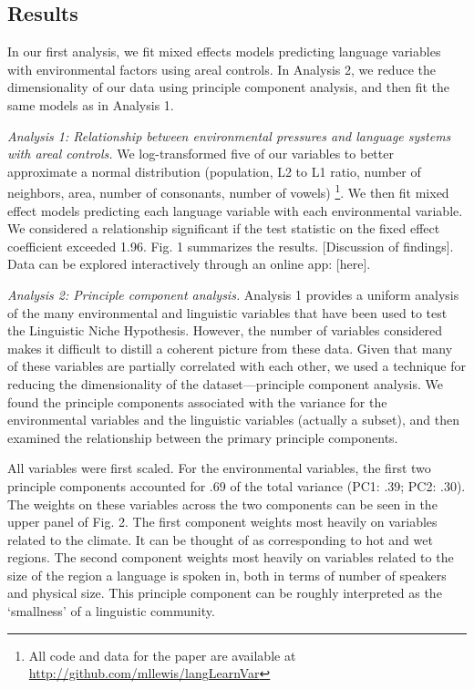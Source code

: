 \documentclass[10pt,letterpaper]{article}
\begin{document}
\subsection{Results}
In our first analysis, we fit mixed effects models predicting language variables with environmental factors using areal controls. In Analysis 2, we reduce the dimensionality of our data using principle component analysis, and then fit the same models as in Analysis 1.

{\it Analysis 1: Relationship between environmental pressures and language systems with areal controls.}
We  log-transformed five of our variables to better approximate a normal distribution (population, L2 to L1 ratio,  number of neighbors, area, number of consonants, number of vowels) \footnote{All code and data for the paper are available at \url{http://github.com/mllewis/langLearnVar}}. We then fit mixed effect models predicting each language variable with each environmental variable. We considered a relationship significant if the test statistic on the fixed effect coefficient exceeded 1.96. Fig. 1 summarizes the results.
[Discussion of findings]. Data can be explored interactively through an online app: [here].

{\it Analysis 2: Principle component analysis.} 
Analysis 1 provides a uniform analysis of the many environmental and linguistic variables that have been used to test the Linguistic Niche Hypothesis. However,  the number of variables considered makes it difficult to distill a coherent picture from these data. Given that many of these variables  are partially correlated with each other, we used a technique for reducing the dimensionality of the dataset---principle component analysis. We found the principle components associated with the variance for the environmental variables and the linguistic variables (actually a subset), and then examined the relationship between the primary principle components.

All variables were first scaled. For the environmental variables, the first two principle components accounted for  .69 of the total variance (PC1: .39; PC2: .30).  The weights on these variables across the two components can be seen in the upper panel of Fig. 2. The first component  weights most heavily on variables related to the climate. It can be thought of as corresponding to hot and wet regions. The second component weights most heavily on variables related to the size of the region a language is spoken in, both in terms of number of speakers and physical size. This principle component can be roughly interpreted as the `smallness' of a linguistic community.
\end{document}

